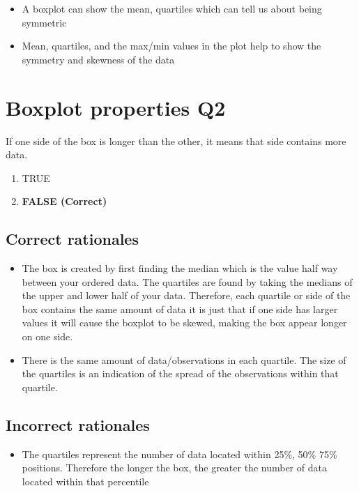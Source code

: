 \documentclass[letterpaper,9pt,twoside,printwatermark=false]{pinp}
\providecommand{\tightlist}{%
  \setlength{\itemsep}{0pt}\setlength{\parskip}{0pt}}
\begin{document}
\begin{itemize}
\tightlist
\item
  A boxplot can show the mean, quartiles which can tell us about being
  symmetric
\item
  Mean, quartiles, and the max/min values in the plot help to show the
  symmetry and skewness of the data
\end{itemize}

\section{Boxplot properties Q2}\label{boxplot-properties-q2}

If one side of the box is longer than the other, it means that side
contains more data.

\begin{enumerate}
\def\labelenumi{\alph{enumi})}
\tightlist
\item
  TRUE
\item
  \textbf{FALSE (Correct)}
\end{enumerate}

\subsection{Correct rationales}\label{correct-rationales-1}

\begin{itemize}
\tightlist
\item
  The box is created by first finding the median which is the value half
  way between your ordered data. The quartiles are found by taking the
  medians of the upper and lower half of your data. Therefore, each
  quartile or side of the box contains the same amount of data it is
  just that if one side has larger values it will cause the boxplot to
  be skewed, making the box appear longer on one side.
\item
  There is the same amount of data/observations in each quartile. The
  size of the quartiles is an indication of the spread of the
  observations within that quartile.
\end{itemize}

\subsection{Incorrect rationales}\label{incorrect-rationales-1}

\begin{itemize}
\tightlist
\item
  The quartiles represent the number of data located within 25\%, 50\%
  75\% positions. Therefore the longer the box, the greater the number
  of data located within that percentile
\end{itemize}
\end{document}
